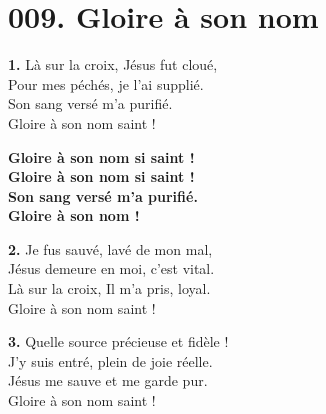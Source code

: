 \documentclass[]{article}
\begin{document}
\hypertarget{h009}{}
\section*{009. Gloire à son nom}
\label{h:009}

\vspace{-0.8em}

\vspace{0.8em}
\medskip
\noindent\textbf{1.} Là sur la croix, Jésus fut cloué,\\
Pour mes péchés, je l'ai supplié.\\
Son sang versé m'a purifié.\\
Gloire à son nom saint !

\medskip
\indent\textbf{Gloire à son nom si saint !}\\
\indent\textbf{Gloire à son nom si saint !}\\
\indent\textbf{Son sang versé m'a purifié.}\\
\indent\textbf{Gloire à son nom !}

\medskip
\noindent\textbf{2.} Je fus sauvé, lavé de mon mal,\\
Jésus demeure en moi, c'est vital.\\
Là sur la croix, Il m'a pris, loyal.\\
Gloire à son nom saint !

\medskip
\noindent\textbf{3.} Quelle source précieuse et fidèle !\\
J'y suis entré, plein de joie réelle.\\
Jésus me sauve et me garde pur.\\
Gloire à son nom saint !
\end{document}
